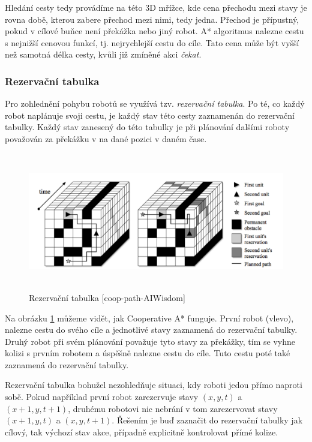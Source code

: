 Hledání cesty tedy provádíme na této 3D mřížce, kde cena přechodu mezi stavy je rovna době, kterou zabere přechod mezi nimi, tedy jedna. Přechod je přípustný, pokud v cílové buňce není překážka nebo jiný robot.
A* algoritmus nalezne cestu s nejnižší cenovou funkcí, tj. nejrychlejší cestu do cíle. Tato cena může být vyšší než samotná délka cesty, kvůli již zmíněné akci \emph{čekat}. 

\subsubsection{Rezervační tabulka}\label{sec:reservationTable}

Pro zohlednění pohybu robotů se využívá tzv. \emph{rezervační tabulka}. Po té, co každý robot naplánuje svoji cestu, je každý stav této cesty zaznamenán do rezervační tabulky. Každý stav zanesený do této tabulky je při plánování dalšími roboty považován za překážku v na dané pozici v daném čase. 

\begin{figure}[htb]
	\begin{center}
		\includegraphics*[width=15cm,height=6cm,keepaspectratio]{obr/reservationTable}
	\end{center}
	\caption[caption]{Rezervační tabulka [coop-path-AIWisdom]}
	\label{obr:reservationTable}
\end{figure}

Na obrázku \ref{obr:reservationTable} můžeme vidět, jak Cooperative A* funguje. První robot (vlevo), nalezne cestu do svého cíle a jednotlivé stavy zaznamená do rezervační tabulky. Druhý robot při svém plánování považuje tyto stavy za překážky, tím se vyhne kolizi s prvním robotem a úspěšně nalezne cestu do cíle. Tuto cestu poté také zaznamená do rezervační tabulky.

Rezervační tabulka bohužel nezohledňuje situaci, kdy roboti jedou přímo naproti sobě. Pokud například první robot zarezervuje stavy $\left(x,y,t\right)$ a $\left(x+1,y,t+1\right)$, druhému robotovi nic nebrání v tom zarezervovat stavy $\left(x+1,y,t\right)$ a $\left(x,y,t+1\right)$. Řešením je buď zaznačit do rezervační tabulky jak cílový, tak výchozí stav akce, případně explicitně kontrolovat přímé kolize.


